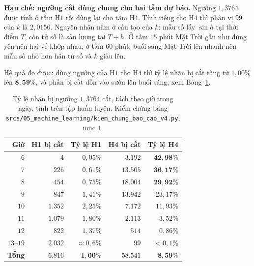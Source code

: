 \documentclass[12pt, a4paper]{report}
\begin{document}
\textbf{Hạn chế: ngưỡng cắt dùng chung cho hai tầm dự báo.} Ngưỡng $1{,}3764$ được tính ở tầm
H$1$ rồi dùng lại cho tầm H$4$. Tính riêng cho H$4$ thì phân vị $99$ của $k$ là $2{,}0156$.
Nguyên nhân nằm ở cấu tạo của $k$: mẫu số lấy $\sin h$ tại thời điểm $T$, còn tử số là sản
lượng tại $T+h$. Ở tầm $15$ phút Mặt Trời gần như đứng yên nên hai vế khớp nhau; ở tầm $60$
phút, buổi sáng Mặt Trời lên nhanh nên mẫu số nhỏ hơn hẳn tử số và $k$ giàu lên.

Hệ quả đo được: dùng ngưỡng của H$1$ cho H$4$ thì tỷ lệ nhãn bị cắt tăng từ $1{,}00\%$ lên
$\mathbf{8{,}59\%}$, và phần bị cắt dồn vào sườn lên buổi sáng, xem
Bảng~\ref{tab:cat_theo_gio}.

\begin{table}[htbp]
\centering
\caption{Tỷ lệ nhãn bị ngưỡng $1{,}3764$ cắt, tách theo giờ trong ngày, tính trên tập huấn
luyện. Kiểm chứng bằng \texttt{srcs/05\_machine\_learning/kiem\_chung\_bao\_cao\_v4.py}, mục $1$.}
\label{tab:cat_theo_gio}
\small
\begin{tabular}{r r r r r}
\toprule
\textbf{Giờ} & \textbf{H1 bị cắt} & \textbf{Tỷ lệ H1} & \textbf{H4 bị cắt} & \textbf{Tỷ lệ H4} \\
\midrule
$6$  & $4$     & $0{,}05\%$ & $3.192$  & $\mathbf{42{,}98\%}$ \\
$7$  & $226$   & $0{,}61\%$ & $13.505$ & $\mathbf{36{,}17\%}$ \\
$8$  & $454$   & $0{,}75\%$ & $18.004$ & $\mathbf{29{,}92\%}$ \\
$9$  & $847$   & $1{,}41\%$ & $13.942$ & $23{,}17\%$ \\
$10$ & $1.352$ & $2{,}25\%$ & $7.172$  & $11{,}93\%$ \\
$11$ & $1.079$ & $1{,}80\%$ & $2.113$  & $3{,}52\%$ \\
$12$ & $822$   & $1{,}37\%$ & $514$    & $0{,}86\%$ \\
$13$--$19$ & $2.032$ & $\approx 0{,}6\%$ & $99$ & $< 0{,}1\%$ \\
\midrule
\textbf{Tổng} & $\mathbf{6.816}$ & $\mathbf{1{,}00\%}$ & $\mathbf{58.541}$ & $\mathbf{8{,}59\%}$ \\
\bottomrule
\end{tabular}
\caption[Tỷ lệ nhãn bị ngưỡng $1{,}3764$ cắt, tách theo giờ trong ngày, tính trên tập huấn luyện]{Tỷ lệ nhãn bị ngưỡng $1{,}3764$ cắt, tách theo giờ trong ngày, tính trên tập huấn
luyện. Kiểm chứng bằng \texttt{srcs/05\_machine\_learning/kiem\_chung\_bao\_cao\_v4.py}, mục $1$.}
\label{tab:cat_theo_gio}
\end{table}
\end{document}
